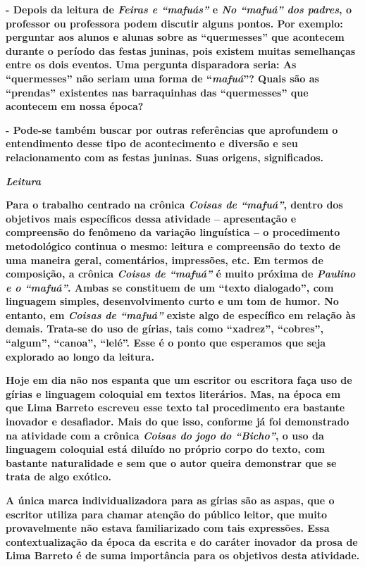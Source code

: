 \textbf{- Depois da leitura de \emph{Feiras e ``mafuás''} e \emph{No
``mafuá'' dos padres}, o professor ou professora podem discutir alguns
pontos. Por exemplo: perguntar aos alunos e alunas sobre as
``quermesses'' que acontecem durante o período das festas juninas, pois
existem muitas semelhanças entre os dois eventos. Uma pergunta
disparadora seria: As ``quermesses'' não seriam uma forma de
``\emph{mafuá}''? Quais são as ``prendas'' existentes nas barraquinhas
das ``quermesses'' que acontecem em nossa época?}

\textbf{- Pode-se também buscar por outras referências que aprofundem o
entendimento desse tipo de acontecimento e diversão e seu relacionamento
com as festas juninas. Suas origens, significados. }

\emph{\textbf{Leitura}}

\textbf{Para o trabalho centrado na crônica \emph{Coisas de ``mafuá''},
dentro dos objetivos mais específicos dessa atividade -- apresentação e
compreensão do fenômeno da variação linguística -- o procedimento
metodológico continua o mesmo: leitura e compreensão do texto de uma
maneira geral, comentários, impressões, etc. Em termos de composição, a
crônica \emph{Coisas de ``mafuá''} é muito próxima de \emph{Paulino e o
``mafuá''}. Ambas se constituem de um ``texto dialogado'', com linguagem
simples, desenvolvimento curto e um tom de humor. No entanto, em
\emph{Coisas de ``mafuá''} existe algo de específico em relação às
demais. Trata-se do uso de gírias, tais como ``xadrez'', ``cobres'',
``algum'', ``canoa'', ``lelé''. Esse é o ponto que esperamos que seja
explorado ao longo da leitura.}

\textbf{Hoje em dia não nos espanta que um escritor ou escritora faça
uso de gírias e linguagem coloquial em textos literários. Mas, na época
em que Lima Barreto escreveu esse texto tal procedimento era bastante
inovador e desafiador. Mais do que isso, conforme já foi demonstrado na
atividade com a crônica \emph{Coisas do jogo do ``Bicho''}, o uso da
linguagem coloquial está diluído no próprio corpo do texto, com bastante
naturalidade e sem que o autor queira demonstrar que se trata de algo
exótico. }

\textbf{A única marca individualizadora para as gírias são as aspas, que
o escritor utiliza para chamar atenção do público leitor, que muito
provavelmente não estava familiarizado com tais expressões. Essa
contextualização da época da escrita e do caráter inovador da prosa de
Lima Barreto é de suma importância para os objetivos desta atividade. }

